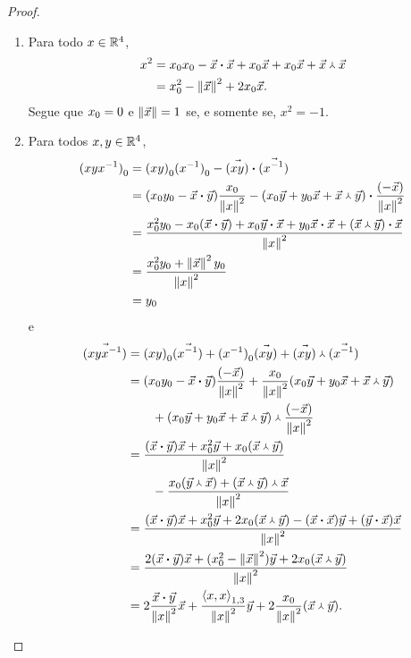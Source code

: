 \begin{proof}
\begin{enumerate}
	\item Para todo $x \in \mathbb{R}^4$,
		\begin{align*}
		x^2 &= {x}_0{x}_0 - {\vec{x}} \bm{\cdot} {\vec{x}}+{x}_0\vec{x}+{x}_0\vec{x}+{\vec{x}} \Yup {\vec{x}} \\
			&= {x}_0^2 - \left\Vert{\vec{x}}\right\Vert^2 + 2{x}_0\vec{x}.
		\end{align*}
Segue que ${x}_0=0$ e $\left\Vert{\vec{x}}\right\Vert=1$ se, e somente se, $x^2=-1$.

	\item Para todos $x,y \in \mathbb{R}^4$,
		\begin{align*}
		{(xyx^{-1})}_0 &= {(xy)}_0{(x^{-1})}_0 - {\vec{(xy)}} \bm{\cdot} {\vec{(x^{-1})}} \\
			&= ({x}_0{y}_0 - {\vec{x}} \bm{\cdot} {\vec{y}})\frac{{x}_0}{\left\Vert{x}\right\Vert^2} - {({x}_0\vec{y} + {y}_0\vec{x} + {\vec{x}} \Yup {\vec{y}})} \bm{\cdot} {\frac{(-\vec{x})}{\left\Vert{x}\right\Vert^2}} \\
			&= \frac{{x}_0^2{y}_0 - {x}_0({\vec{x}} \bm{\cdot} {\vec{y}}) + {x}_0{\vec{y}} \bm{\cdot} {\vec{x}} + {y}_0{\vec{x}} \bm{\cdot} {\vec{x}} + {({\vec{x}} \Yup {\vec{y}})} \bm{\cdot} {\vec{x}}}{\left\Vert{x}\right\Vert^2} \\
			&= \frac{{x}_0^2{y}_0 + \left\Vert{\vec{x}}\right\Vert^2{y}_0}{\left\Vert{x}\right\Vert^2} \\
			&= {y}_0
		\end{align*}
e
		\begin{align*}
		\vec{(xyx^{-1})} &= {(xy)}_0\vec{(x^{-1})} + {(x^{-1})}_0\vec{(xy)} + {\vec{(xy)}} \Yup {\vec{(x^{-1})}} \\
			&= ({x}_0{y}_0 - {\vec{x}} \bm{\cdot} {\vec{y}})\frac{(-\vec{x})}{\left\Vert{x}\right\Vert^2}
			+ \frac{{x}_0}{\left\Vert{x}\right\Vert^2}({x}_0\vec{y} + {y}_0\vec{x} + {\vec{x}} \Yup {\vec{y}}) \\
				&\qquad + {({x}_0\vec{y} + {y}_0\vec{x} + {\vec{x}} \Yup {\vec{y}})} \Yup {\frac{(-\vec{x})}{\left\Vert{x}\right\Vert^2}} \\
			&= \frac{({\vec{x}} \bm{\cdot} {\vec{y}})\vec{x} + {x}_0^2\vec{y} + {x}_0({\vec{x}} \Yup {\vec{y}})}{\left\Vert{x}\right\Vert^2} \\
				&\qquad - \frac{{x}_0({\vec{y}} \Yup {\vec{x})} + {({\vec{x}} \Yup {\vec{y}})} \Yup {\vec{x}}}{\left\Vert{x}\right\Vert^2} \\
			&= \frac{({\vec{x}} \bm{\cdot} {\vec{y}})\vec{x}+ {x}_0^2\vec{y} + 2{x}_0({\vec{x}} \Yup {\vec{y}}) - ({\vec{x}} \bm{\cdot} {\vec{x}})\vec{y} + ({\vec{y}} \bm{\cdot} {\vec{x}})\vec{x}}{\left\Vert{x}\right\Vert^2} \\
			&= \frac{2({\vec{x}} \bm{\cdot} {\vec{y}})\vec{x} + ({x}_0^2-\left\Vert{\vec{x}}\right\Vert^2)\vec{y} + 2{x}_0({\vec{x}} \Yup {\vec{y}})}{\left\Vert{x}\right\Vert^2} \\
			&= 2\frac{{\vec{x}} \bm{\cdot} {\vec{y}}}{\left\Vert{x}\right\Vert^2}\vec{x} + \frac{\left\langle{x},{x}\right\rangle_{1,3}}{\left\Vert{x}\right\Vert^2}\vec{y} + 2\frac{{x}_0}{\left\Vert{x}\right\Vert^2}({\vec{x}} \Yup {\vec{y}}).
		\end{align*}


\end{enumerate}
\end{proof}
